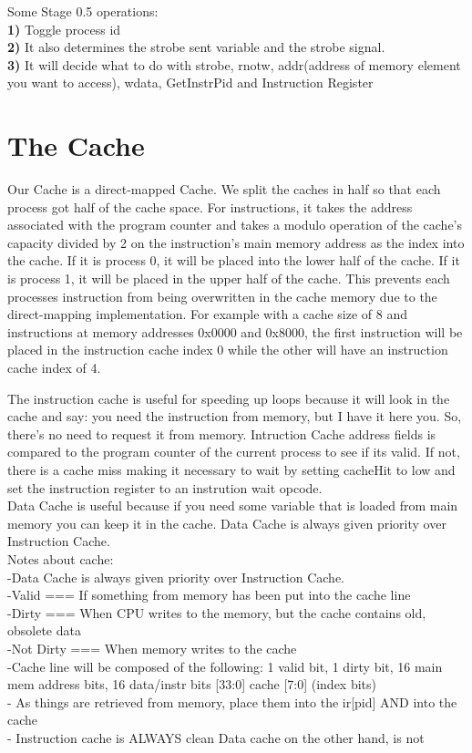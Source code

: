 \documentclass[12pt, twocolumn]{scrartcl}
\begin{document}
Some Stage 0.5 operations: \\
\textbf {1)} Toggle process id \\
\textbf {2)} It also determines the strobe sent variable and the strobe signal. \\
\textbf {3)} It will decide what to do with strobe, rnotw, addr(address of memory element you want to access), wdata, GetInstrPid and Instruction Register \\

\section*{The Cache}

Our Cache is a direct-mapped Cache. We split the caches in half so that each process got half of the cache space. For instructions, it takes the address associated with the program counter and takes a modulo operation of the cache's capacity divided by 2 on the instruction's main memory address as the index into the cache. If it is process 0, it will be placed into the lower half of the cache. If it is process 1, it will be placed in the upper half of the cache. This prevents each processes instruction from being overwritten in the cache memory due to the direct-mapping implementation. For example with a cache size of 8 and instructions at memory addresses 0x0000 and 0x8000, the first instruction will be placed in the instruction cache index 0 while the other will have an instruction cache index of 4. 

The instruction cache is useful for speeding up loops because it will look in the cache and say: you need the instruction from memory, but I have it here you. So, there's no need to request it from memory. Intruction Cache address fields is compared to the program counter of the current process to see if its valid.  If not, there is a cache miss making it necessary to wait by setting cacheHit to low and set the instruction register to an instrution wait opcode. \\

Data Cache is useful because if you need some variable that is loaded from main memory you can keep it in the cache.  Data Cache is always given priority over Instruction Cache.\\

Notes about cache: \\
-Data Cache is always given priority over Instruction Cache. \\
-Valid === If something from memory has been put into the cache line \\
-Dirty === When CPU writes to the memory, but the cache contains old, obsolete data \\
-Not Dirty === When memory writes to the cache \\
-Cache line will be composed of the following: {1 valid bit, 1 dirty bit, 16 main mem address bits, 16 data/instr bits} [33:0] cache [7:0] (index bits) \\
- As things are retrieved from memory, place them into the ir[pid] AND into the cache \\
- Instruction cache is ALWAYS clean Data cache on the other hand, is not \\
\end{document}
